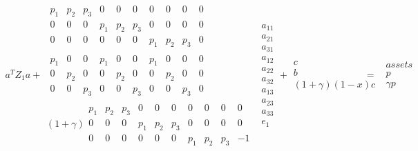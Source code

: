 \documentclass{article}
\begin{document}
\begin{eqnarray*}
a^{T}Z_{1}a+%
\begin{array}{c}
\begin{array}{cccccccccc}
p_{1} & p_{2} & p_{3} & 0 & 0 & 0 & 0 & 0 & 0 & 0 \\ 
0 & 0 & 0 & p_{1} & p_{2} & p_{3} & 0 & 0 & 0 & 0 \\ 
0 & 0 & 0 & 0 & 0 & 0 & p_{1} & p_{2} & p_{3} & 0%
\end{array}
\\ 
\begin{array}{cccccccccc}
p_{1} & 0 & 0 & p_{1} & 0 & 0 & p_{1} & 0 & 0 & 0 \\ 
0 & p_{2} & 0 & 0 & p_{2} & 0 & 0 & p_{2} & 0 & 0 \\ 
0 & 0 & p_{3} & 0 & 0 & p_{3} & 0 & 0 & p_{3} & 0%
\end{array}
\\ 
\left( 1+\gamma \right) 
\begin{array}{cccccccccc}
p_{1} & p_{2} & p_{3} & 0 & 0 & 0 & 0 & 0 & 0 & 0 \\ 
0 & 0 & 0 & p_{1} & p_{2} & p_{3} & 0 & 0 & 0 & 0 \\ 
0 & 0 & 0 & 0 & 0 & 0 & p_{1} & p_{2} & p_{3} & -1%
\end{array}%
\end{array}%
\begin{array}{c}
a_{11} \\ 
a_{21} \\ 
a_{31} \\ 
a_{12} \\ 
a_{22} \\ 
a_{32} \\ 
a_{13} \\ 
a_{23} \\ 
a_{33} \\ 
e_{1}%
\end{array}%
+%
\begin{array}{c}
c \\ 
b \\ 
\left( 1+\gamma \right) \left( 1-x\right) c%
\end{array}
&=&%
\begin{array}{c}
assets \\ 
p \\ 
\gamma p%
\end{array}
\\
&&
\end{eqnarray*}%
\end{document}
